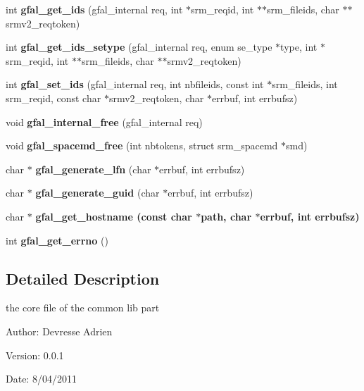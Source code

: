 \begin{CompactItemize}
\item 
int \textbf{gfal\_\-get\_\-ids} (gfal\_\-internal req, int $\ast$srm\_\-reqid, int $\ast$$\ast$srm\_\-fileids, char $\ast$$\ast$srmv2\_\-reqtoken)\label{gfal__common_8c_40c4088ef63981a3878a55a050ae6328}

\item 
int \textbf{gfal\_\-get\_\-ids\_\-setype} (gfal\_\-internal req, enum se\_\-type $\ast$type, int $\ast$srm\_\-reqid, int $\ast$$\ast$srm\_\-fileids, char $\ast$$\ast$srmv2\_\-reqtoken)\label{gfal__common_8c_a60d676ab5378d44d133a772aee07fb0}

\item 
int \textbf{gfal\_\-set\_\-ids} (gfal\_\-internal req, int nbfileids, const int $\ast$srm\_\-fileids, int srm\_\-reqid, const char $\ast$srmv2\_\-reqtoken, char $\ast$errbuf, int errbufsz)\label{gfal__common_8c_54d854da5f0c755a6b43e81b723dde98}

\item 
void \textbf{gfal\_\-internal\_\-free} (gfal\_\-internal req)\label{gfal__common_8c_73cd999ee9b3b89a7902c24d89ed8113}

\item 
void \textbf{gfal\_\-spacemd\_\-free} (int nbtokens, struct srm\_\-spacemd $\ast$smd)\label{group__internal__group_gb22308fb1cfbade81dddfcf4bedf86da}

\item 
char $\ast$ \textbf{gfal\_\-generate\_\-lfn} (char $\ast$errbuf, int errbufsz)\label{group__internal__group_gcd48b57bf9659be5204319918c6f9d20}

\item 
char $\ast$ \textbf{gfal\_\-generate\_\-guid} (char $\ast$errbuf, int errbufsz)\label{group__internal__group_g8311ede197e204e57029165fbc3898d6}

\item 
char $\ast$ \bf{gfal\_\-get\_\-hostname} (const char $\ast$path, char $\ast$errbuf, int errbufsz)
\item 
int \textbf{gfal\_\-get\_\-errno} ()\label{gfal__common_8c_4f4c3163c72535da9dd42484905b1c7c}

\end{CompactItemize}


\subsection{Detailed Description}
the core file of the common lib part 

\begin{Desc}
\item[Author:]Devresse Adrien \end{Desc}
\begin{Desc}
\item[Version:]0.0.1 \end{Desc}
\begin{Desc}
\item[Date:]8/04/2011 \end{Desc}
